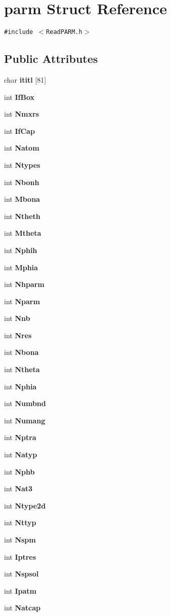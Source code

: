 \section{parm  Struct Reference}
\label{structparm}
{\tt \#include $<$Read\-PARM.h$>$}

\subsection*{Public Attributes}
\begin{CompactItemize}
\item 
char {\bf ititl} [81]
\item 
int {\bf If\-Box}
\item 
int {\bf Nmxrs}
\item 
int {\bf If\-Cap}
\item 
int {\bf Natom}
\item 
int {\bf Ntypes}
\item 
int {\bf Nbonh}
\item 
int {\bf Mbona}
\item 
int {\bf Ntheth}
\item 
int {\bf Mtheta}
\item 
int {\bf Nphih}
\item 
int {\bf Mphia}
\item 
int {\bf Nhparm}
\item 
int {\bf Nparm}
\item 
int {\bf Nnb}
\item 
int {\bf Nres}
\item 
int {\bf Nbona}
\item 
int {\bf Ntheta}
\item 
int {\bf Nphia}
\item 
int {\bf Numbnd}
\item 
int {\bf Numang}
\item 
int {\bf Nptra}
\item 
int {\bf Natyp}
\item 
int {\bf Nphb}
\item 
int {\bf Nat3}
\item 
int {\bf Ntype2d}
\item 
int {\bf Nttyp}
\item 
int {\bf Nspm}
\item 
int {\bf Iptres}
\item 
int {\bf Nspsol}
\item 
int {\bf Ipatm}
\item 
int {\bf Natcap}
\item 

\end{CompactItemize}
